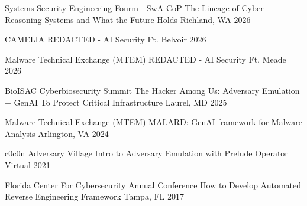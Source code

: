 
\begin{cventries}

  \cventry
    {Systems Security Engineering Fourm - SwA CoP} %
    {The Lineage of Cyber Reasoning Systems and What the Future Holds} %
    {Richland, WA} %
    {2026} %
    {} %

  \cventry
    {CAMELIA} %
    {REDACTED - AI Security} %
    {Ft. Belvoir} %
    {2026} %
    {} %

  \cventry
    {Malware Technical Exchange (MTEM)} %
    {REDACTED - AI Security} %
    {Ft. Meade} %
    {2026} %
    {} %

  \cventry
    {BioISAC Cyberbiosecurity Summit} %
    {The Hacker Among Us: Adversary Emulation + GenAI To Protect Critical Infrastructure} %
    {Laurel, MD} %
    {2025} %
    {} %

  \cventry
    {Malware Technical Exchange (MTEM)} %
    {MALARD: GenAI framework for Malware Analysis} %
    {Arlington, VA} %
    {2024} %
    {} %

  \cventry
    {c0c0n Adversary Village} %
    {Intro to Adversary Emulation with Prelude Operator} %
    {Virtual} %
    {2021} %
    {} %

  \cventry
    {Florida Center For Cybersecurity Annual Conference} %
    {How to Develop Automated Reverse Engineering Framework} %
    {Tampa, FL} %
    {2017} %
    {} %

\end{cventries}
